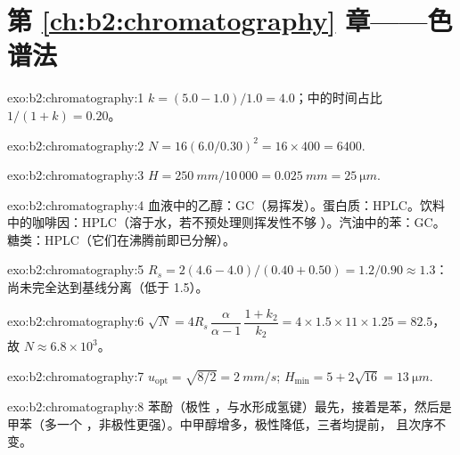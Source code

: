 \section*{第 \ref{ch:b2:chromatography} 章——色谱法}

\begin{solution}{exo:b2:chromatography:1}
$k = (5.0 - 1.0)/1.0 = 4.0$；中的时间占比 $1/(1 + k) = 0.20$。
\end{solution}

\begin{solution}{exo:b2:chromatography:2}
$N = 16(6.0/0.30)^2 = 16 \times 400 = 6400$.
\end{solution}

\begin{solution}{exo:b2:chromatography:3}
$H = \qty{250}{mm}/10\,000 = \qty{0.025}{mm} = \qty{25}{\micro m}$.
\end{solution}

\begin{solution}{exo:b2:chromatography:4}
血液中的乙醇：GC（易挥发）。蛋白质：HPLC。饮料中的咖啡因：HPLC（溶于水，若不预处理则挥发性不够
）。汽油中的苯：GC。糖类：HPLC（它们在沸腾前即已分解）。
\end{solution}

\begin{solution}{exo:b2:chromatography:5}
$R_s = 2(4.6 - 4.0)/(0.40 + 0.50) = 1.2/0.90 \approx 1.3$：尚未完全达到基线分离（低于 1.5）。
\end{solution}

\begin{solution}{exo:b2:chromatography:6}
$\sqrt N = 4R_s\,\dfrac{\alpha}{\alpha - 1}\,\dfrac{1 + k_2}{k_2} = 4 \times 1.5 \times 11 \times 1.25 =
82.5$，故 $N \approx 6.8 \times 10^3$。
\end{solution}

\begin{solution}{exo:b2:chromatography:7}
$u_{\mathrm{opt}} = \sqrt{8/2} = \qty{2}{mm/s}$; $H_{\min} = 5 + 2\sqrt{16} = \qty{13}{\micro m}$.
\end{solution}

\begin{solution}{exo:b2:chromatography:8}
苯酚（极性 ，与水形成氢键）最先，接着是苯，然后是甲苯（多一个
，非极性更强）。中甲醇增多，极性降低，三者均提前，
且次序不变。
\end{solution}

